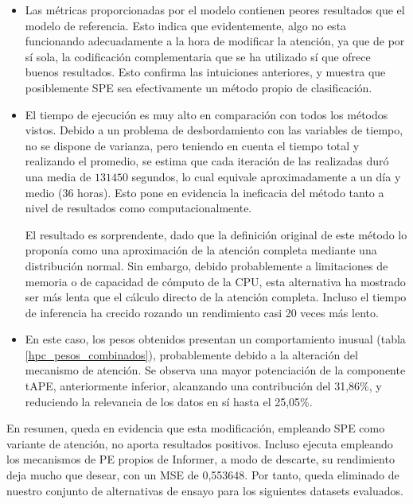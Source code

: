 \begin{itemize}
	\item Las métricas proporcionadas por el modelo contienen peores resultados que el modelo de referencia. Esto indica que evidentemente, algo no esta funcionando adecuadamente a la hora de modificar la atención, ya que de por sí sola, la codificación complementaria que se ha utilizado sí que ofrece buenos resultados. Esto confirma las intuiciones anteriores, y muestra que posiblemente SPE sea efectivamente un método propio de clasificación.
	
	\item El tiempo de ejecución es muy alto en comparación con todos los métodos vistos. Debido a un problema de desbordamiento con las variables de tiempo, no se dispone de varianza, pero teniendo en cuenta el tiempo total y realizando el promedio, se estima que cada iteración de las realizadas duró una media de $131450$ segundos, lo cual equivale aproximadamente a un día y medio (36 horas). Esto pone en evidencia la ineficacia del método tanto a nivel de resultados como computacionalmente. 
	
	El resultado es sorprendente, dado que la definición original de este método lo proponía como una aproximación de la atención completa mediante una distribución normal. Sin embargo, debido probablemente a limitaciones de memoria o de capacidad de cómputo de la CPU, esta alternativa ha mostrado ser más lenta que el cálculo directo de la atención completa. Incluso el tiempo de inferencia ha crecido rozando un rendimiento casi 20 veces más lento.
	
	\item En este caso, los pesos obtenidos presentan un comportamiento inusual (tabla \ref{hpc_pesos_combinados}), probablemente debido a la alteración del mecanismo de atención. Se observa una mayor potenciación de la componente tAPE, anteriormente inferior, alcanzando una contribución del 31,86\%, y reduciendo la relevancia de los datos en sí hasta el 25,05\%. 
	
\end{itemize}

En resumen, queda en evidencia que esta modificación, empleando SPE como variante de atención, no aporta resultados positivos. Incluso ejecuta empleando los mecanismos de PE propios de Informer, a modo de descarte, su rendimiento deja mucho que desear, con un MSE de  0,553648. Por tanto, queda eliminado de nuestro conjunto de alternativas de ensayo para los siguientes datasets evaluados.

